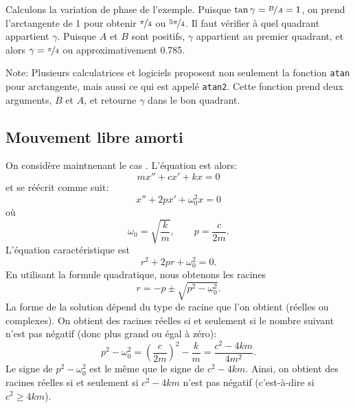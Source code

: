 Calculons la variation de phase de l'exemple.
Puisque $\tan \gamma = \nicefrac{B}{A} = 1$, on prend l'arctangente de 1 pour obtenir 
$\nicefrac{\pi}{4}$ ou $\nicefrac{5\pi}{4}$. 
Il faut vérifier à quel quadrant appartient $\gamma$.
Puisque  $A$ et $B$ sont positifs, $\gamma$ appartient au premier quadrant, et alors $\gamma =
\nicefrac{\pi}{4}$ ou approximativement 0.785.

Note: Plusieurs calculatrices et logiciels proposent non seulement la fonction 
\texttt{atan} pour arctangente, mais aussi ce qui est appelé  \texttt{atan2}.
Cette fonction prend deux arguments, $B$ et $A$, et retourne $\gamma$ dans le bon quadrant.



\subsection{Mouvement libre amorti}


On considère maintnenant le cas .  L'équation est alors: 
\begin{equation*}
	m x'' + c x' + kx = 0
\end{equation*}
et se réécrit comme suit: 
\begin{equation*}
	x'' + 2p x' + \omega_0^2 x = 0
\end{equation*}
où
\begin{equation*}
	\omega_0 = \sqrt{\frac{k}{m}}, \qquad p = \frac{c}{2m} .
\end{equation*}
L'équation caractéristique est
\begin{equation*}
	r^2 + 2 pr + \omega_0^2 = 0 .
\end{equation*}
En utilisant la formule quadratique, nous obtenons les racines 
\begin{equation*}
	r = -p \pm \sqrt{p^2 - \omega_0^2} .
\end{equation*}
La forme de la solution dépend du type de racine que l'on obtient (réelles ou complexes). 
On obtient des racines réelles si et seulement si le nombre suivant n'est pas négatif (donc plus grand ou égal à zéro): 
\begin{equation*}
	p^2 - \omega_0^2 = {\left( \frac{c}{2m} \right)}^2 - \frac{k}{m}
					 = \frac{c^2 - 4km}{4m^2} .
\end{equation*}
Le signe de $p^2-\omega_0^2$ est le même que le signe de $c^2 - 4km$.  
Ainsi, on obtient des racines réelles si et seulement si  $c^2-4km$ n'est pas négatif (c'est-à-dire si $c^2 \geq 4km$).



